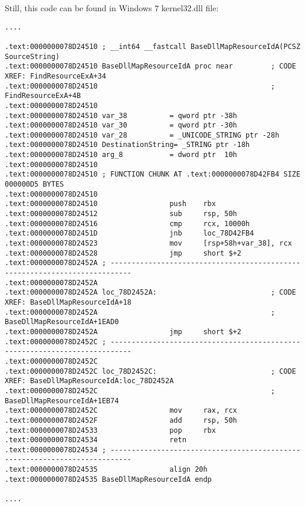 Still, this code can be found in Windows 7 kernel32.dll file:

\begin{lstlisting}[style=customasmx86]
....

.text:0000000078D24510 ; __int64 __fastcall BaseDllMapResourceIdA(PCSZ SourceString)
.text:0000000078D24510 BaseDllMapResourceIdA proc near         ; CODE XREF: FindResourceExA+34
.text:0000000078D24510                                         ; FindResourceExA+4B
.text:0000000078D24510
.text:0000000078D24510 var_38          = qword ptr -38h
.text:0000000078D24510 var_30          = qword ptr -30h
.text:0000000078D24510 var_28          = _UNICODE_STRING ptr -28h
.text:0000000078D24510 DestinationString= _STRING ptr -18h
.text:0000000078D24510 arg_8           = dword ptr  10h
.text:0000000078D24510
.text:0000000078D24510 ; FUNCTION CHUNK AT .text:0000000078D42FB4 SIZE 000000D5 BYTES
.text:0000000078D24510
.text:0000000078D24510                 push    rbx
.text:0000000078D24512                 sub     rsp, 50h
.text:0000000078D24516                 cmp     rcx, 10000h
.text:0000000078D2451D                 jnb     loc_78D42FB4
.text:0000000078D24523                 mov     [rsp+58h+var_38], rcx
.text:0000000078D24528                 jmp     short $+2
.text:0000000078D2452A ; ---------------------------------------------------------------------------
.text:0000000078D2452A
.text:0000000078D2452A loc_78D2452A:                           ; CODE XREF: BaseDllMapResourceIdA+18
.text:0000000078D2452A                                         ; BaseDllMapResourceIdA+1EAD0
.text:0000000078D2452A                 jmp     short $+2
.text:0000000078D2452C ; ---------------------------------------------------------------------------
.text:0000000078D2452C
.text:0000000078D2452C loc_78D2452C:                           ; CODE XREF: BaseDllMapResourceIdA:loc_78D2452A
.text:0000000078D2452C                                         ; BaseDllMapResourceIdA+1EB74
.text:0000000078D2452C                 mov     rax, rcx
.text:0000000078D2452F                 add     rsp, 50h
.text:0000000078D24533                 pop     rbx
.text:0000000078D24534                 retn
.text:0000000078D24534 ; ---------------------------------------------------------------------------
.text:0000000078D24535                 align 20h
.text:0000000078D24535 BaseDllMapResourceIdA endp

....


\end{lstlisting}
